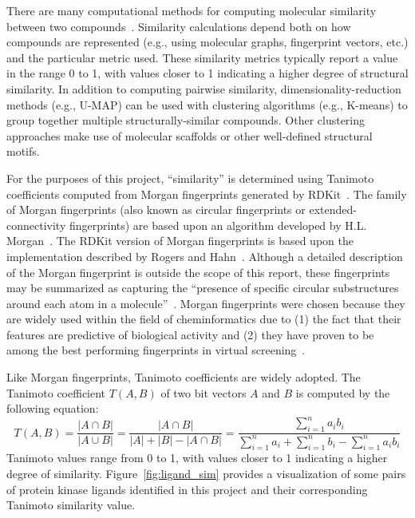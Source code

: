 \documentclass[11pt]{article}
\begin{document}
There are many computational methods for computing molecular similarity between two compounds~\cite{molsim_2024}. Similarity calculations depend both on how compounds are represented (e.g., using molecular graphs, fingerprint vectors, etc.) and the particular metric used. 
These similarity metrics typically report a value in the range 0 to 1, with values closer to 1 indicating a higher degree of structural similarity. In addition to computing pairwise similarity, dimensionality-reduction methods (e.g., U-MAP) can be used with clustering algorithms (e.g., K-means) to group together multiple structurally-similar compounds. Other clustering approaches make use of molecular scaffolds or other well-defined structural motifs.

For the purposes of this project, ``similarity'' is determined using Tanimoto coefficients computed from Morgan fingerprints generated by RDKit~\cite{greg_landrum_2024_11396708}. 
The family of Morgan fingerprints (also known as circular fingerprints or extended-connectivity fingerprints) are based upon an algorithm developed by H.L. Morgan~\cite{morgan_1965}. 
The RDKit version of Morgan fingerprints is based upon the implementation described by Rogers and Hahn~\cite{rogers_hahn_2010}. 
Although a detailed description of the Morgan fingerprint is outside the scope of this report, these fingerprints may be summarized as capturing the ``presence of specific circular substructures around each atom in a molecule''~\cite{capecchi_probst_reymond_2020}. 
Morgan fingerprints were chosen because they are widely used within the field of cheminformatics due to (1) the fact that their features are predictive of biological activity and (2) they have proven to be among the best performing fingerprints in virtual screening~\cite{capecchi_probst_reymond_2020}. 

Like Morgan fingerprints, Tanimoto coefficients are widely adopted. 
The Tanimoto coefficient $T(A,B)$ of two bit vectors $A$ and $B$ is computed by the following equation:
\begin{equation}\label{eq:1}
T(A,B) = \frac{|A \cap B|}{|A \cup B|} = \frac{|A \cap B|}{|A| + |B| - |A \cap B|} = \frac{\sum_{i=1}^{n} a_i b_i}{\sum_{i=1}^{n} a_i + \sum_{i=1}^{n} b_i - \sum_{i=1}^{n} a_i b_i}
\end{equation}
\noindent
Tanimoto values range from 0 to 1, with values closer to 1 indicating a higher degree of similarity.
Figure~\ref{fig:ligand_sim} provides a visualization of some pairs of protein kinase ligands identified in this project and their corresponding Tanimoto similarity value.
\end{document}
